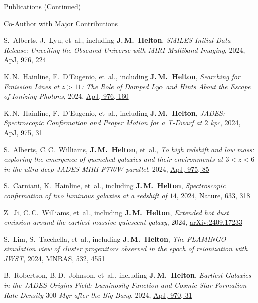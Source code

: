 \documentclass{JMH_CV}
\begin{document}
\begin{rSection}{Publications (Continued)}
\begin{rSubsection}{Co-Author with Major Contributions}{}{}{}
\begin{etaremune}
    \item S.~Alberts, J.~Lyu, et~al., including \textbf{J.\,M.~Helton}, \textit{SMILES Initial Data Release: Unveiling the Obscured Universe with MIRI Multiband Imaging}, 2024, \href{https://www.scixplorer.org/abs/2024ApJ...976..224A/abstract}{\ul{ApJ, 976, 224}}

    \item K.\,N.~Hainline, F.~D'Eugenio, et~al., including \textbf{J.\,M.~Helton}, \textit{Searching for Emission Lines at $\mathit{z > 11}$: The Role of Damped Ly$\mathit{\alpha}$ and Hints About the Escape of Ionizing Photons}, 2024, \href{https://www.scixplorer.org/abs/2024ApJ...976..160H/abstract}{\ul{ApJ, 976, 160}}

    \item K.\,N.~Hainline, F.~D'Eugenio, et~al., including \textbf{J.\,M.~Helton}, \textit{JADES: Spectroscopic Confirmation and Proper Motion for a T-Dwarf at $\mathit{2}$ kpc}, 2024, \href{https://www.scixplorer.org/abs/2024ApJ...975...31H/abstract}{\ul{ApJ, 975, 31}}

    \item S.~Alberts, C.\,C.~Williams, \textbf{J.\,M.~Helton}, et~al., \textit{To high redshift and low mass: exploring the emergence of quenched galaxies and their environments at $\mathit{3 < z < 6}$ in the ultra-deep JADES MIRI F770W parallel}, 2024, \href{https://www.scixplorer.org/abs/2024ApJ...975...85A/abstract}{\ul{ApJ, 975, 85}}

    \item S.~Carniani, K.~Hainline, et~al., including \textbf{J.\,M.~Helton}, \textit{Spectroscopic confirmation of two luminous galaxies at a redshift of $\mathit{14}$}, 2024, \href{https://www.scixplorer.org/abs/2024Natur.633..318C/abstract}{\ul{Nature, 633, 318}}

    \item Z.~Ji, C.\,C.~Williams, et~al., including \textbf{J.\,M.~Helton}, \textit{Extended hot dust emission around the earliest massive quiescent galaxy}, 2024, \href{https://www.scixplorer.org/abs/2024arXiv240917233J/abstract}{\ul{arXiv:2409.17233}}

    \item S.~Lim, S.~Tacchella, et~al., including \textbf{J.\,M.~Helton}, \textit{The FLAMINGO simulation view of cluster progenitors observed in the epoch of reionization with JWST}, 2024, \href{https://www.scixplorer.org/abs/2024MNRAS.532.4551L/abstract}{\ul{MNRAS, 532, 4551}}

    \item B.~Robertson, B.\,D.~Johnson, et~al., including \textbf{J.\,M.~Helton}, \textit{Earliest Galaxies in the JADES Origins Field: Luminosity Function and Cosmic Star-Formation Rate Density $\mathit{300}$ Myr after the Big Bang}, 2024, \href{https://www.scixplorer.org/abs/2024ApJ...970...31R/abstract}{\ul{ApJ, 970, 31}}


\end{etaremune}
\end{rSubsection}
\end{rSection}
\end{document}
